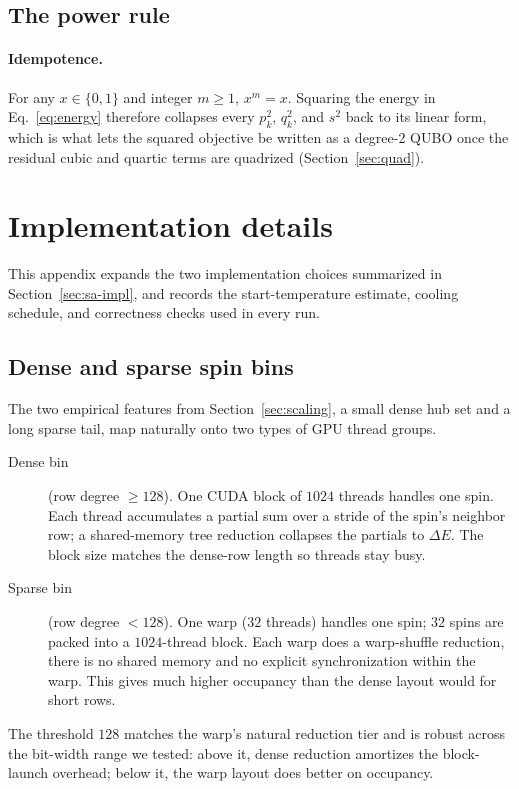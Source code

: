 \documentclass[pdflatex,sn-apa]{sn-jnl}%
\theoremstyle{thmstyleone}%
\theoremstyle{thmstyletwo}%
\theoremstyle{thmstylethree}%
\newcommand{\dE}{\Delta E}
\begin{document}
\begin{appendices}
\subsection{The power rule}

\paragraph{Idempotence.} For any $x \in \{0,1\}$ and integer $m \geq 1$, $x^m = x$. Squaring the energy in Eq.~\eqref{eq:energy} therefore collapses every $p_k^2$, $q_k^2$, and $s^2$ back to its linear form, which is what lets the squared objective be written as a degree-2 QUBO once the residual cubic and quartic terms are quadrized (Section~\ref{sec:quad}).

\section{Implementation details}\label{app:impl}

This appendix expands the two implementation choices summarized in Section~\ref{sec:sa-impl}, and records the start-temperature estimate, cooling schedule, and correctness checks used in every run.

\subsection{Dense and sparse spin bins}\label{sec:sa-bins}

The two empirical features from Section~\ref{sec:scaling}, a small dense hub set and a long sparse tail, map naturally onto two types of GPU thread groups.
\begin{description}
\item[Dense bin] (row degree $\geq 128$). One CUDA block of $1024$ threads handles one spin. Each thread accumulates a partial sum over a stride of the spin's neighbor row; a shared-memory tree reduction collapses the partials to $\dE$. The block size matches the dense-row length so threads stay busy.
\item[Sparse bin] (row degree $< 128$). One warp ($32$ threads) handles one spin; $32$ spins are packed into a $1024$-thread block. Each warp does a warp-shuffle reduction, there is no shared memory and no explicit synchronization within the warp. This gives much higher occupancy than the dense layout would for short rows.
\end{description}
The threshold $128$ matches the warp's natural reduction tier and is robust across the bit-width range we tested: above it, dense reduction amortizes the block-launch overhead; below it, the warp layout does better on occupancy.


\end{appendices}
\end{document}

